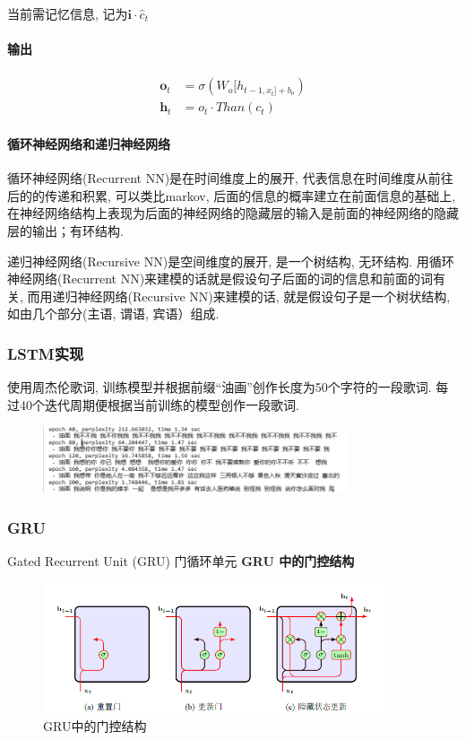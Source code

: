 \documentclass[a4paper]{article}
\theoremstyle{definition}
\numberwithin{equation}{section}
\begin{document}
当前需记忆信息, 记为$\mathbf{i} \cdot \hat{c}_t$

\paragraph{输出}
\begin{align*}
\mathbf{o}_t  & =\sigma(W_o[h_{t-1, x_t]+b_o}) \\
\mathbf{h}_t & ={o}_t \cdot Than(c_t)
\end{align*}
 

\paragraph{循环神经网络和递归神经网络}

循环神经网络(Recurrent NN)是在时间维度上的展开, 代表信息在时间维度从前往后的的传递和积累, 可以类比markov, 后面的信息的概率建立在前面信息的基础上, 在神经网络结构上表现为后面的神经网络的隐藏层的输入是前面的神经网络的隐藏层的输出；有环结构.

递归神经网络(Recursive NN)是空间维度的展开, 是一个树结构, 无环结构.
用循环神经网络(Recurrent NN)来建模的话就是假设句子后面的词的信息和前面的词有关, 而用递归神经网络(Recursive NN)来建模的话, 就是假设句子是一个树状结构, 如由几个部分(主语, 谓语, 宾语）组成.

\subsubsection{LSTM实现}
使用周杰伦歌词, 训练模型并根据前缀“油画”创作⻓度为50个字符的⼀段歌词. 每过40个迭代周期便根据当前训练的模型创作⼀段歌词. 
\begin{figure}[!ht]
    \center
    \includegraphics[width=0.8\textwidth]{lyrics.png}
    \end{figure} 
\subsubsection{GRU}
Gated Recurrent Unit (GRU) 门循环单元
\textbf{GRU 中的门控结构}

\begin{figure}[!htb]
\centering
\includegraphics[width=0.9\textwidth]{GRU.png}
\caption{GRU中的门控结构}
\end{figure}
\end{document}
